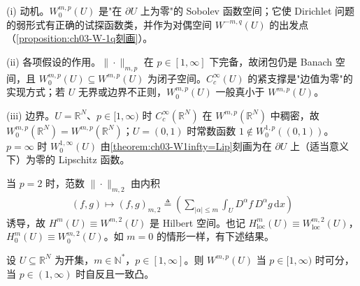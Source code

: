 \documentclass[../../main.tex]{subfiles}%
\begin{document}
\begin{remark}\label{remark:ch03-W0动机}
(i) 动机。$W^{m,p}_0(U)$ 是"在 $\partial U$ 上为零"的 Sobolev 函数空间；它使 Dirichlet 问题的弱形式有正确的试探函数类，并作为对偶空间 $W^{-m,q}(U)$ 的出发点（\cref{proposition:ch03-W-1q刻画}）。

(ii) 各项假设的作用。$\|\cdot\|_{m,p}$ 在 $p\in[1,\infty]$ 下完备，故闭包仍是 Banach 空间，且 $W^{m,p}_0(U)\subseteq W^{m,p}(U)$ 为闭子空间。$C^\infty_c(U)$ 的紧支撑是"边值为零"的实现方式；若 $U$ 无界或边界不正则，$W^{m,p}_0(U)$ 一般真小于 $W^{m,p}(U)$。

(iii) 边界。$U=\mathbb{R}^N$、$p\in[1,\infty)$ 时 $C^\infty_c(\mathbb{R}^N)$ 在 $W^{m,p}(\mathbb{R}^N)$ 中稠密，故 $W^{m,p}_0(\mathbb{R}^N)=W^{m,p}(\mathbb{R}^N)$；$U=(0,1)$ 时常数函数 $1\notin W^{1,p}_0((0,1))$。$p=\infty$ 时 $W^{1,\infty}_0(U)$ 由\cref{theorem:ch03-W1infty=Lip}刻画为在 $\partial U$ 上（适当意义下）为零的 Lipschitz 函数。
\end{remark}

当 $p=2$ 时，范数 $\|\cdot\|_{m,2}$ 由内积
\begin{align*}
(f,g)\mapsto(f,g)_{m,2}\triangleq\left(\sum_{|\alpha|\leqslant m}\int_U D^\alpha f\,D^\alpha g\,\mathrm{d}x\right)
\end{align*}
诱导，故 $H^m(U)\equiv W^{m,2}(U)$ 是 Hilbert 空间。也记 $H^m_{\mathrm{loc}}(U)\equiv W^{m,2}_{\mathrm{loc}}(U)$，$H^m_0(U)\equiv W^{m,2}_0(U)$。如 $m=0$ 的情形一样，有下述结果。

\begin{theorem}\label{theorem:ch03-Sobolev可分}
设 $U\subseteq\mathbb{R}^N$ 为开集，$m\in\mathbb{N}^*$，$p\in[1,\infty]$。则 $W^{m,p}(U)$ 当 $p\in[1,\infty)$ 时可分，当 $p\in(1,\infty)$ 时自反且一致凸。
\end{theorem}
\end{document}
